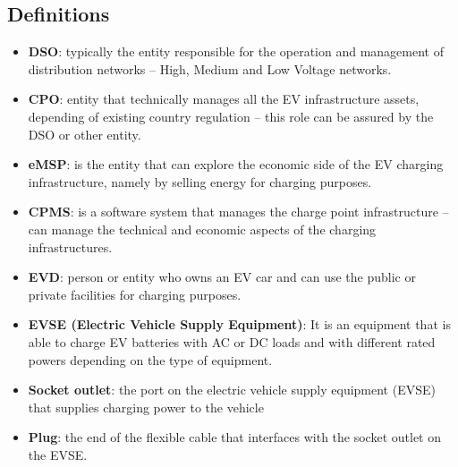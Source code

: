 \subsection{Definitions}
\begin{itemize}
    \item \textbf{DSO}: typically the entity responsible for the operation and management of distribution networks – High, Medium and Low Voltage networks.
    \item \textbf{CPO}: entity that technically manages all the EV infrastructure assets, depending of existing country regulation – this role can be assured by the DSO or other entity.
    \item \textbf{eMSP}: is the entity that can explore the economic side of the EV charging infrastructure, namely by selling energy for charging purposes.
    \item \textbf{CPMS}: is a software system that manages the charge point infrastructure – can manage the technical and economic aspects of the charging infrastructures.
    \item  \textbf{EVD}: person or entity who owns an EV car and can use the public or private facilities for charging purposes.
    \item \textbf{EVSE (Electric Vehicle Supply Equipment)}: It is an equipment that is able to charge EV batteries with AC or DC loads and with different rated powers depending on the type of equipment.
    \item \textbf{Socket outlet}: the port on the electric vehicle supply equipment (EVSE) that supplies charging power to the vehicle
    \item \textbf{Plug}: the end of the flexible cable that interfaces with the socket outlet on the EVSE.

\end{itemize}
